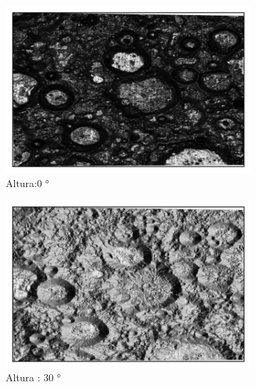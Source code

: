 \documentclass[12pt]{article}
\begin{document}
\begin{figure}[H]
    \centering
    \begin{subfigure}[b]{0.3\textwidth}
        \centering
        \includegraphics[width=\textwidth]{images/Azimuth_45_altitude_70.png}
        \caption{Altura:0 °}
        \label{fig: altura_70}
    \end{subfigure}
    \hfill
    \begin{subfigure}[b]{0.3\textwidth}
        \centering
        \includegraphics[width=\textwidth]{images/Azimuth_45_altitude_45.png}
        \caption{Altura : 30 °}
        \label{fig:altura_45}
    \end{subfigure}
    \hfill
    \begin{subfigure}[b]{0.3\textwidth}
        \centering

\end{subfigure}
\end{figure}
\end{document}
